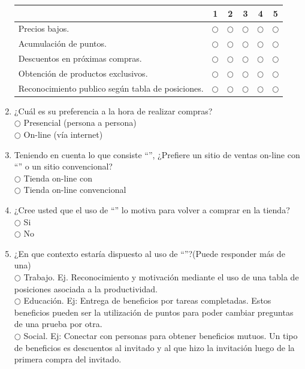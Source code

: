 \begin{enumerate}
\begin{table}[h]
\centering
\begin{tabular}{|l|c|c|c|c|c|}
\hline
 & {\bf 1} & {\bf 2} & {\bf 3} & {\bf 4} & {\bf 5} \\
\hline
Precios bajos. & $\bigcirc$ & $\bigcirc$ & $\bigcirc$ & $\bigcirc$ & $\bigcirc$ \\
\hline
Acumulación de puntos. & $\bigcirc$ & $\bigcirc$ & $\bigcirc$ & $\bigcirc$ & $\bigcirc$ \\
\hline
Descuentos en próximas compras. & $\bigcirc$ & $\bigcirc$ & $\bigcirc$ & $\bigcirc$ & $\bigcirc$ \\
\hline
Obtención de productos exclusivos. & $\bigcirc$ & $\bigcirc$ & $\bigcirc$ & $\bigcirc$ & $\bigcirc$ \\
\hline
Reconocimiento publico según tabla de posiciones. & $\bigcirc$ & $\bigcirc$ & $\bigcirc$ & $\bigcirc$ & $\bigcirc$ \\
\hline
\end{tabular}
\end{table}

\item ¿Cuál es su preferencia a la hora de realizar compras? \\

$\bigcirc$ Presencial (persona a persona) \\
$\bigcirc$ On-line (vía internet)

\item Teniendo en cuenta lo que consiste ``{\gam}'', ¿Prefiere un sitio de ventas on-line con ``{\gam}'' o un sitio convencional? \\

$\bigcirc$ Tienda on-line con {\gam} \\
$\bigcirc$ Tienda on-line convencional

\item ¿Cree usted que el uso de ``{\gam}'' lo motiva para volver a comprar en la tienda? \\

$\bigcirc$ Si \\
$\bigcirc$ No

\item  ¿En que contexto estaría dispuesto al uso de ``{\gam}''?(Puede responder más de una)\\
 
$\bigcirc$ Trabajo. Ej. Reconocimiento y motivación mediante el uso de una tabla de posiciones asociada a la productividad. \\
$\bigcirc$ Educación. Ej: Entrega de beneficios por tareas completadas. Estos beneficios pueden ser la utilización de puntos para poder cambiar preguntas de una prueba por otra. \\
$\bigcirc$  Social. Ej: Conectar con personas para obtener beneficios mutuos. Un tipo de beneficios es descuentos al invitado y al que hizo la invitación luego de la primera compra del invitado.
\end{enumerate}

